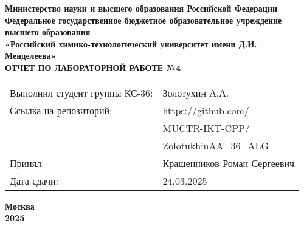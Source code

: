 \documentclass[12pt, a4paper]{report}
\begin{document}
	\begin{titlepage}
		\begin{center}
			\large \textbf{Министерство науки и высшего образования Российской Федерации} \\
			\large \textbf{Федеральное государственное бюджетное образовательное учреждение высшего образования} \\
			\large \textbf{«Российский химико-технологический университет имени Д.И. Менделеева»} \\

			\vspace*{4cm}
			\LARGE \textbf{ОТЧЕТ ПО ЛАБОРАТОРНОЙ РАБОТЕ №4}

			\vspace*{4cm}
			\begin{flushright}
				\Large
				\begin{tabular}{>{\raggedleft\arraybackslash}p{9cm} p{10cm}}
					Выполнил студент группы КС-36: & Золотухин А.А. \\
					Ссылка на репозиторий: & https://github.com/ \\
					& MUCTR-IKT-CPP/ \\
					& ZolotukhinAA\_36\_ALG \\
					Принял: & Крашенников Роман Сергеевич \\
					Дата сдачи: & 24.03.2025 \\
				\end{tabular}
			\end{flushright}

			\vspace*{6cm}
			\Large \textbf{Москва \\ 2025}
		\end{center}
	\end{titlepage}

	\tableofcontents
	\thispagestyle{empty}
	\newpage

\end{document}
